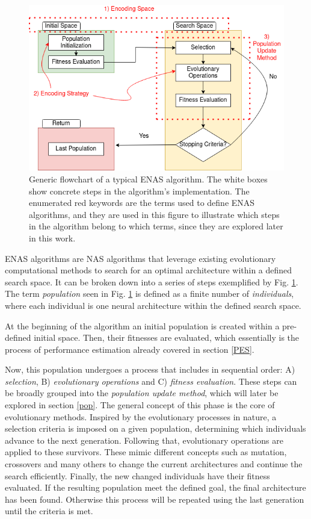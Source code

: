 \documentclass[10pt,        %
               a4paper,     %
               journal,     %
               ]{IEEEtran}
\begin{document}
\begin{figure}[!h]
    \centering
    \includegraphics[scale=0.4]{evol}
    \caption{
        Generic flowchart of a typical ENAS algorithm. The white boxes show concrete steps in the algorithm's
        implementation. The enumerated red keywords are the terms used to define ENAS algorithms, and they are used
        in this figure to illustrate which steps in the algorithm belong to which terms, since they are explored
        later in this work.
    }
    \label{evol}
\end{figure}

ENAS algorithms are NAS algorithms that leverage existing evolutionary computational methods
to search for an optimal architecture within a defined search space. It can be broken
down into a series of steps exemplified by Fig. \ref{evol}.
The term \textit{population} seen in Fig. \ref{evol} is defined as a finite number of \textit{individuals},
where each individual is one neural architecture within the defined search space.

At the beginning of the algorithm an initial population is created within a pre-defined initial space.
Then, their fitnesses are evaluated, which essentially is the process of
performance estimation already covered in section \ref{PES}.

Now, this population undergoes a process that includes in sequential order:
A) \textit{selection}, B) \textit{evolutionary operations} and C) \textit{fitness evaluation}. These
steps can be broadly grouped into the \textit{population update method}, which will later be explored in
section \ref{pop}. The general concept of this phase is the core of evolutionary methods. Inspired by
the evolutionary processes in nature, a selection criteria is imposed on a given population, determining which
individuals advance to the next generation. Following that, evolutionary operations are applied to these survivors.
These mimic different concepts such as mutation, crossovers and many others to change the current architectures
and continue the search efficiently. Finally, the new changed individuals have their fitness evaluated.
If the resulting population meet the defined goal, the final architecture has been found.
Otherwise this process will be repeated using the last generation until the criteria is met.
\end{document}
